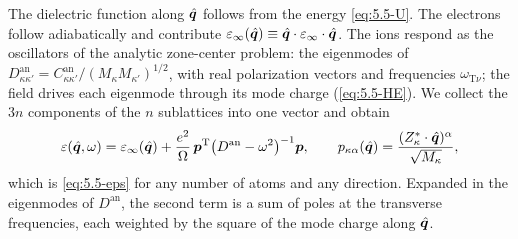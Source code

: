 The dielectric function along $\hat{\bm{q}}$ follows from the energy \cref{eq:5.5-U}. The electrons follow adiabatically and contribute $\varepsilon_\infty(\hat{\bm{q}}) \equiv \hat{\bm{q}}\cdot\varepsilon_\infty\cdot\hat{\bm{q}}$. The ions respond as the oscillators of the analytic zone-center problem: the eigenmodes of $D^{\mathrm{an}}_{\kappa\kappa'} = C^{\mathrm{an}}_{\kappa\kappa'}/(M_\kappa M_{\kappa'})^{1/2}$, with real polarization vectors and frequencies $\omega_{\mathrm{T}\nu}$; the field drives each eigenmode through its mode charge (\cref{eq:5.5-HE}). We collect the $3n$ components of the $n$ sublattices into one vector and obtain
\begin{equation}
  \varepsilon(\hat{\bm{q}},\omega) = \varepsilon_\infty(\hat{\bm{q}}) + \frac{e^2}{\Omega}\,\bm{p}^{\mathrm{T}}\bigl(D^{\mathrm{an}} - \omega^2\bigr)^{-1}\bm{p} ,
  \qquad p_{\kappa\alpha}(\hat{\bm{q}}) = \frac{(Z^*_\kappa\cdot\hat{\bm{q}})^\alpha}{\sqrt{M_\kappa}} ,
  \label{eq:11.2-eps}
\end{equation}
which is \cref{eq:5.5-eps} for any number of atoms and any direction. Expanded in the eigenmodes of $D^{\mathrm{an}}$, the second term is a sum of poles at the transverse frequencies, each weighted by the square of the mode charge along $\hat{\bm{q}}$.

